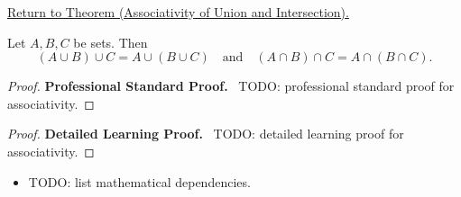 \newpage
{}
\label{prf:associativity}

\begin{remark*}[Return]
\hyperref[thm:associativity]{Return to Theorem (Associativity of Union and Intersection).}
\end{remark*}

\begin{theorem*}
Let $A,B,C$ be sets. Then
\[
(A \cup B) \cup C = A \cup (B \cup C)
\quad\text{and}\quad
(A \cap B) \cap C = A \cap (B \cap C).
\]
\end{theorem*}

\begin{proof}
\textbf{Professional Standard Proof.}~
TODO: professional standard proof for associativity.
\end{proof}

\begin{proof}
\textbf{Detailed Learning Proof.}~
TODO: detailed learning proof for associativity.
\end{proof}

\begin{remark*}
\end{remark*}

\begin{dependencies}
\begin{itemize}
  \item TODO: list mathematical dependencies.
\end{itemize}
\end{dependencies}

\clearpage
